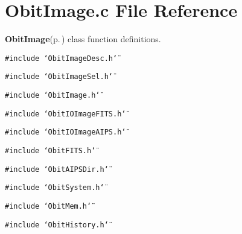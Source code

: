 \section{Obit\-Image.c File Reference}
\label{ObitImage_8c}
{\bf Obit\-Image}{\rm (p.\,\pageref{structObitImage})} class function definitions. 

{\tt \#include \char`\"{}Obit\-Image\-Desc.h\char`\"{}}\par
{\tt \#include \char`\"{}Obit\-Image\-Sel.h\char`\"{}}\par
{\tt \#include \char`\"{}Obit\-Image.h\char`\"{}}\par
{\tt \#include \char`\"{}Obit\-IOImage\-FITS.h\char`\"{}}\par
{\tt \#include \char`\"{}Obit\-IOImage\-AIPS.h\char`\"{}}\par
{\tt \#include \char`\"{}Obit\-FITS.h\char`\"{}}\par
{\tt \#include \char`\"{}Obit\-AIPSDir.h\char`\"{}}\par
{\tt \#include \char`\"{}Obit\-System.h\char`\"{}}\par
{\tt \#include \char`\"{}Obit\-Mem.h\char`\"{}}\par
{\tt \#include \char`\"{}Obit\-History.h\char`\"{}}\par
